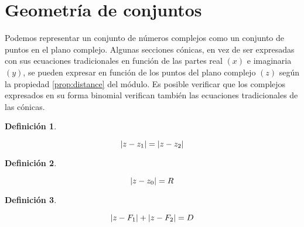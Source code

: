 \documentclass[a5paper,12pt,twoside]{book}
\newtheorem{defn}{{Definición}}[chapter]
\begin{document}
\section{Geometría de conjuntos}

Podemos representar un conjunto de números complejos como un conjunto de puntos en el plano complejo.
Algunas secciones cónicas, en vez de ser expresadas con sus ecuaciones tradicionales en función de las partes real $(x)$ e imaginaria $(y)$, se pueden expresar en función de los puntos del plano complejo $(z)$ según la propiedad \ref{prop:distance} del módulo.
Es posible verificar que los complejos expresados en su forma binomial verifican también las ecuaciones tradicionales de las cónicas.

\begin{mdframed}[style=DefinitionFrame]
    \begin{defn}
    \end{defn}
    \begin{equation*}
        {\left| {z-z_1} \right|} = {\left| {z-z_2} \right|}
    \end{equation*}
\end{mdframed}

\begin{center}
    \def\svgwidth{0.6\linewidth}
    
\end{center}

\begin{mdframed}[style=DefinitionFrame]
    \begin{defn}
    \end{defn}
    \begin{equation*}
        {\left| {z-z_0} \right|} = R
    \end{equation*}
\end{mdframed}

\begin{center}
    \def\svgwidth{0.6\linewidth}
    
\end{center}

\begin{mdframed}[style=DefinitionFrame]
    \begin{defn}
    \end{defn}
    \begin{equation*}
        {\left| {z-F_1} \right|} + {\left| {z-F_2} \right|} = D
    \end{equation*}
\end{mdframed}
\end{document}

